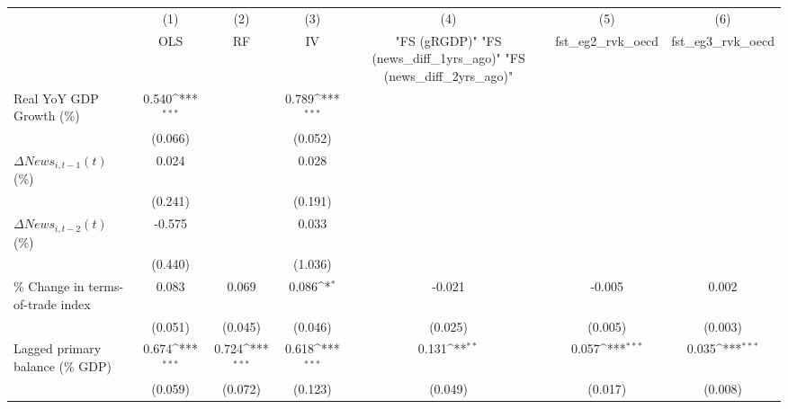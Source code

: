 {
\def\sym#1{\ifmmode^{#1}\else\(^{#1}\)\fi}
\begin{tabular}{l*{6}{c}}
\toprule
                    &\multicolumn{1}{c}{(1)}&\multicolumn{1}{c}{(2)}&\multicolumn{1}{c}{(3)}&\multicolumn{1}{c}{(4)}&\multicolumn{1}{c}{(5)}&\multicolumn{1}{c}{(6)}\\
                    &\multicolumn{1}{c}{OLS}&\multicolumn{1}{c}{RF}&\multicolumn{1}{c}{IV}&\multicolumn{1}{c}{ "FS (gRGDP)"  "FS (news_diff_1yrs_ago)"  "FS (news_diff_2yrs_ago)" }&\multicolumn{1}{c}{fst_eg2_rvk_oecd}&\multicolumn{1}{c}{fst_eg3_rvk_oecd}\\
\midrule
Real YoY GDP Growth (\%)&       0.540\sym{***}&                     &       0.789\sym{***}&                     &                     &                     \\
                    &     (0.066)         &                     &     (0.052)         &                     &                     &                     \\
\addlinespace
$ \Delta News_{i,t-1}(t)$ (\%)&       0.024         &                     &       0.028         &                     &                     &                     \\
                    &     (0.241)         &                     &     (0.191)         &                     &                     &                     \\
\addlinespace
$ \Delta News_{i,t-2}(t)$ (\%)&      -0.575         &                     &       0.033         &                     &                     &                     \\
                    &     (0.440)         &                     &     (1.036)         &                     &                     &                     \\
\addlinespace
\% Change in terms-of-trade index&       0.083         &       0.069         &       0.086\sym{*}  &      -0.021         &      -0.005         &       0.002         \\
                    &     (0.051)         &     (0.045)         &     (0.046)         &     (0.025)         &     (0.005)         &     (0.003)         \\
\addlinespace
Lagged primary balance (\% GDP)&       0.674\sym{***}&       0.724\sym{***}&       0.618\sym{***}&       0.131\sym{**} &       0.057\sym{***}&       0.035\sym{***}\\
                    &     (0.059)         &     (0.072)         &     (0.123)         &     (0.049)         &     (0.017)         &     (0.008)         \\

\end{tabular}}
